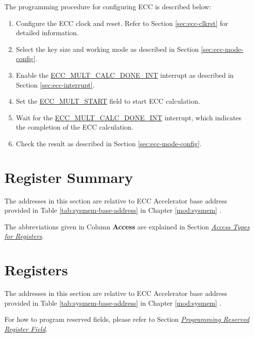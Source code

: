 \documentclass[main\_\_EN.tex]{subfiles}
\begin{document}
The programming procedure for configuring ECC is described below:

\begin{enumerate}
    \item Configure the ECC clock and reset. Refer to Section \ref{sec:ecc-clkrst} for detailed information.
    \item Select the key size and working mode as described in Section \ref{sec:ecc-mode-config}.
    \item Enable the \hyperref[int:ECCMULTCALCDONEINT]{ECC\_MULT\_CALC\_DONE\_INT} interrupt as described in Section \ref{sec:ecc-interrupt}.
    \item Set the \hyperref[fielddesc:ECCMULTSTART]{ECC\_MULT\_START} field to start ECC calculation.
    \item Wait for the \hyperref[int:ECCMULTCALCDONEINT]{ECC\_MULT\_CALC\_DONE\_INT} interrupt, which indicates the completion of the ECC calculation.
    \item Check the result as described in Section \ref{sec:ecc-mode-config}.
\end{enumerate}




\newpage
\hypertarget{ecc-reg-summ}{}
\section{Register Summary}
\label{sec:ecc-reg-summ}

The addresses in this section are relative to ECC Accelerator base address provided in Table \ref{tab:sysmem-base-address} in Chapter \ref{mod:sysmem} \textit{}.

The abbreviations given in Column \textbf{Access} are explained in Section \hyperref[glossary-access-types]{\textit{Access Types for Registers}}.






\newpage
\section{Registers}

The addresses in this section are relative to ECC Accelerator base address provided in Table \ref{tab:sysmem-base-address} in Chapter \ref{mod:sysmem} \textit{}.

For how to program reserved fields, please refer to Section \hyperref[programming-reserved-field]{\textit{Programming Reserved Register Field}}.


\end{document}
